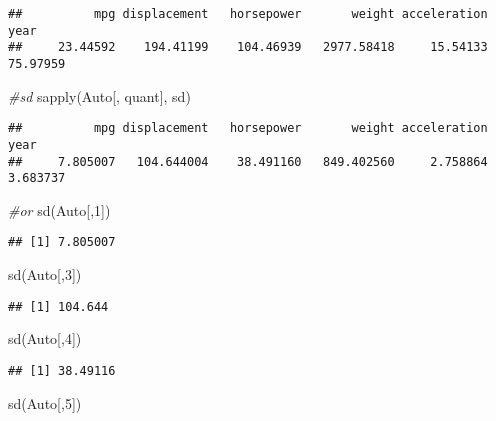 \documentclass[
]{article}
\newenvironment{Shaded}{\begin{snugshade}}{\end{snugshade}}
\newcommand{\CommentTok}[1]{\textcolor[rgb]{0.56,0.35,0.01}{\textit{#1}}}
\newcommand{\DecValTok}[1]{\textcolor[rgb]{0.00,0.00,0.81}{#1}}
\newcommand{\FunctionTok}[1]{\textcolor[rgb]{0.00,0.00,0.00}{#1}}
\newcommand{\NormalTok}[1]{#1}
\begin{document}
\begin{verbatim}
##          mpg displacement   horsepower       weight acceleration         year 
##     23.44592    194.41199    104.46939   2977.58418     15.54133     75.97959
\end{verbatim}

\begin{Shaded}
\begin{Highlighting}[]
\CommentTok{\#sd}
\FunctionTok{sapply}\NormalTok{(Auto[, quant], sd)}
\end{Highlighting}
\end{Shaded}

\begin{verbatim}
##          mpg displacement   horsepower       weight acceleration         year 
##     7.805007   104.644004    38.491160   849.402560     2.758864     3.683737
\end{verbatim}

\begin{Shaded}
\begin{Highlighting}[]
\CommentTok{\#or}
\FunctionTok{sd}\NormalTok{(Auto[,}\DecValTok{1}\NormalTok{])}
\end{Highlighting}
\end{Shaded}

\begin{verbatim}
## [1] 7.805007
\end{verbatim}

\begin{Shaded}
\begin{Highlighting}[]
\FunctionTok{sd}\NormalTok{(Auto[,}\DecValTok{3}\NormalTok{])}
\end{Highlighting}
\end{Shaded}

\begin{verbatim}
## [1] 104.644
\end{verbatim}

\begin{Shaded}
\begin{Highlighting}[]
\FunctionTok{sd}\NormalTok{(Auto[,}\DecValTok{4}\NormalTok{])}
\end{Highlighting}
\end{Shaded}

\begin{verbatim}
## [1] 38.49116
\end{verbatim}

\begin{Shaded}
\begin{Highlighting}[]
\FunctionTok{sd}\NormalTok{(Auto[,}\DecValTok{5}\NormalTok{])}
\end{Highlighting}
\end{Shaded}
\end{document}
